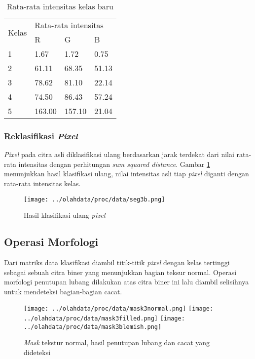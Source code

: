 \documentclass[laporan.tex]{subfiles}
\begin{document}
\begin{table}[h]
\centering
\begin{tabular}{|l|l|l|l|}
\cline{1-4}
\multirow{2}{*}{Kelas} & \multicolumn{3}{l|}{Rata-rata intensitas} \\
\cline{2-4}
 & R & G & B \\
\cline{1-4}
1 & 1.67 & 1.72 & 0.75 \\
2 & 61.11 & 68.35 & 51.13 \\
3 & 78.62 & 81.10 & 22.14 \\
4 & 74.50 & 86.43 & 57.24 \\
5 & 163.00 & 157.10 & 21.04 \\
\cline{1-4}
\end{tabular}
\caption{Rata-rata intensitas kelas baru}
\label{table:newclassavg}
\end{table}

\subsubsection{Reklasifikasi \emph{Pixel}}

\emph{Pixel} pada citra asli diklasifikasi ulang berdasarkan jarak terdekat dari nilai rata-rata intensitas dengan perhitungan \emph{sum squared distance}. Gambar \ref{fig:classfinimg} menunjukkan hasil klasifikasi ulang, nilai intensitas asli tiap \emph{pixel} diganti dengan rata-rata intensitas kelas.

\begin{figure}[h]
\centering
\texttt{[image: ../olahdata/proc/data/seg3b.png]}
\caption{Hasil klasifikasi ulang \emph{pixel}}
\label{fig:classfinimg}
\end{figure}

\subsection{Operasi Morfologi}

Dari matriks data klasifikasi diambil titik-titik \emph{pixel} dengan kelas tertinggi sebagai sebuah citra biner yang menunjukkan bagian teksur normal. Operasi morfologi penutupan lubang dilakukan atas citra biner ini lalu diambil selisihnya untuk mendeteksi bagian-bagian cacat.

\begin{figure}[h!]
\centering
\texttt{[image: ../olahdata/proc/data/mask3normal.png]} \qquad
\texttt{[image: ../olahdata/proc/data/mask3filled.png]} \qquad
\texttt{[image: ../olahdata/proc/data/mask3blemish.png]}
\caption{\emph{Mask} tekstur normal, hasil penutupan lubang dan cacat yang dideteksi}
\end{figure}
\end{document}
